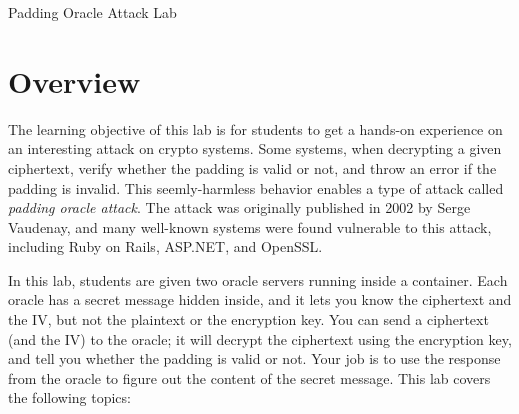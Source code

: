 
\newcommand{\commonfolder}{../../common-files}









\begin{center}
{\LARGE Padding Oracle Attack Lab}
\end{center}


\setcounter{task}{1}
\newcommand{\tasks} {\bf {\noindent (\arabic{task})} \addtocounter{task}{1} \,}



\section{Overview}

The learning objective of this lab is for students to get a hands-on 
experience on an interesting attack on crypto systems. 
Some systems, when decrypting a given ciphertext,
verify whether the padding is valid or not,
and throw an error if the padding is invalid. This
seemly-harmless behavior enables a type of attack
called \textit{padding oracle attack}.
The attack was originally published in 2002 by Serge Vaudenay, and
many well-known systems were found vulnerable to this attack, 
including Ruby on Rails, ASP.NET, and OpenSSL.


In this lab, students are given two oracle servers running inside
a container. Each oracle has a secret message hidden inside,
and it lets you know the ciphertext and the IV, but not the plaintext
or the encryption key. 
You can send a ciphertext (and the IV) to the oracle;
it will decrypt the ciphertext using the encryption key,
and tell you whether the padding is valid or not. 
Your job is to use the response from
the oracle to figure out the content of the secret message. 
This lab covers the following topics:

